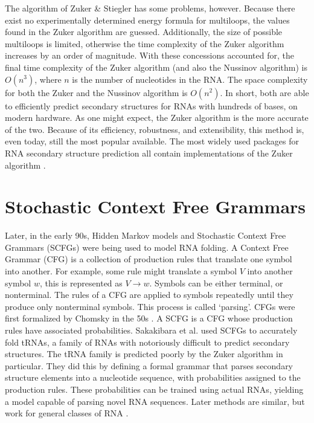 \documentclass[12pt, a4paper]{article}
\begin{document}
The algorithm of Zuker \& Stiegler \cite{zuker1981optimal} has some problems, however. Because there exist no experimentally determined energy formula for multiloops, the values found in the Zuker algorithm are guessed. Additionally, the size of possible multiloops is limited, otherwise the time complexity of the Zuker algorithm increases by an order of magnitude. With these concessions accounted for, the final time complexity of the Zuker algorithm (and also the Nussinov algorithm) is $O(n^3)$, where $n$ is the number of nucleotides in the RNA. The space complexity for both the Zuker and the Nussinov algorithm is $O(n^2)$. In short, both are able to efficiently predict secondary structures for RNAs with hundreds of bases, on modern hardware. As one might expect, the Zuker algorithm is the more accurate of the two. Because of
its efficiency, robustness, and extensibility, this method is,
even today, still the most popular available. The most widely used packages for RNA secondary structure prediction all contain implementations of the Zuker algorithm \cite{lorenz2011viennarna, reuter2010rnastructure}.


\section{Stochastic Context Free Grammars}

Later, in the early 90s, Hidden Markov models and Stochastic Context Free Grammars (SCFGs) were being used to model RNA folding. A Context Free Grammar (CFG) is a collection of production rules that translate one symbol into another. For example, some rule might translate a symbol $V$ into another symbol $w$, this is represented as $V \rightarrow w$. Symbols can be either terminal, or nonterminal. The rules of a CFG are applied to symbols repeatedly until they produce only nonterminal symbols. This process is called `parsing'. CFGs were first formalized by Chomsky in the 50s \cite{chomsky1956three}. A SCFG is a CFG whose production rules have associated probabilities. Sakakibara et al. \cite{sakakibara1994stochastic} used SCFGs to accurately fold tRNAs, a family of RNAs with notoriously difficult to predict secondary structures. The tRNA family is predicted poorly by the Zuker algorithm in particular. They did this by defining a formal grammar that parses secondary structure elements into a nucleotide sequence, with probabilities assigned to the production rules. These probabilities can be trained using actual RNAs, yielding a model capable of parsing novel RNA sequences. Later methods are similar, but work for general classes of RNA \cite{dowell2004evaluation, knudsen2003pfold}.
\end{document}
